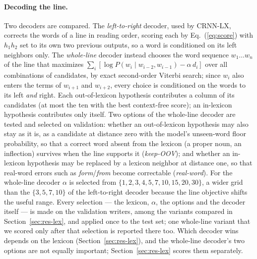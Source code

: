 \documentclass{ws-ijprai}
\newcommand{\ours}{CRNN-LX}            %
\begin{document}
\paragraph{Decoding the line.}
Two decoders are compared. The \emph{left-to-right} decoder, used by
\ours, corrects the words of a line in reading order, scoring each by
Eq.~(\ref{eq:score}) with $h_1 h_2$ set to its own two previous
outputs, so a word is conditioned on its left neighbors only. The
\emph{whole-line} decoder instead chooses the word
sequence $w_1\ldots w_n$ of the line that maximizes
$\sum_i [\log P(w_i \mid w_{i-2}, w_{i-1}) - \alpha\, d_i]$ over all
combinations of candidates, by exact second-order Viterbi search; since
$w_i$ also enters the terms of $w_{i+1}$ and $w_{i+2}$, every choice
is conditioned on the words to its left \emph{and} right. Each
out-of-lexicon hypothesis contributes a column of its candidates (at
most the ten with the best context-free score); an in-lexicon
hypothesis contributes only itself. Two options of the whole-line
decoder are tested and selected on validation: whether an
out-of-lexicon hypothesis may also stay as it is, as a candidate at
distance zero with the model's unseen-word floor probability, so that a
correct word absent from the lexicon (a proper noun, an inflection)
survives when the line supports it (\emph{keep-OOV}); and whether an
in-lexicon hypothesis may be replaced by a lexicon neighbor at
distance one, so that real-word errors such as \emph{form}/\emph{from}
become correctable (\emph{real-word}). For the whole-line decoder
$\alpha$ is selected from $\{1,2,3,4,5,7,10,15,20,30\}$, a wider grid
than the $\{3,5,7,10\}$ of the left-to-right decoder because the line
objective shifts the useful range. Every selection --- the lexicon,
$\alpha$, the options and the decoder itself --- is made on the validation
writers, among the variants compared in Section~\ref{sec:res-lex}, and
applied once to the test set; one whole-line variant that we scored only
after that selection is reported there too. Which decoder wins depends on the
lexicon (Section~\ref{sec:res-lex}), and the whole-line decoder's two
options are not equally important; Section~\ref{sec:res-lex} scores them
separately.
\end{document}
